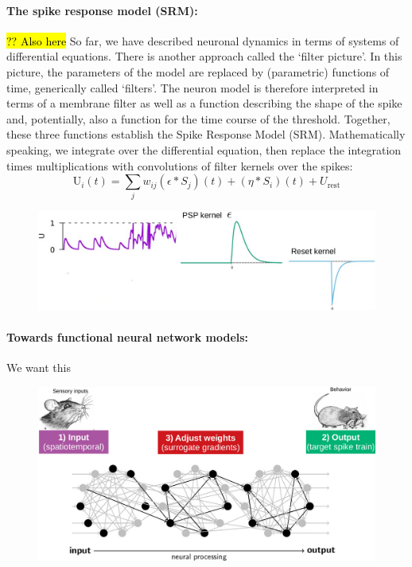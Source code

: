 \documentclass[main]{subfiles}
\begin{document}
\paragraph{The spike response model (SRM):}
\hl{?? Also here}
So far, we have described neuronal dynamics in terms of systems of differential equations. There is another approach called the ‘filter picture’. In this picture, the parameters of the model are replaced by (parametric) functions of time, generically called ‘filters’. The neuron model is therefore interpreted in terms of a membrane filter as well as a function describing the shape of the spike and, potentially, also a function for the time course of the threshold. Together, these three functions establish the Spike Response Model (SRM).
Mathematically speaking, we integrate over the differential equation, then replace the integration times multiplications with convolutions of filter kernels over the spikes:
%
\begin{equation}
\mathrm{U}_{i}(t)=\sum_{j} w_{i j}\left(\epsilon * S_{j}\right)(t)+\left(\eta * S_{i}\right)(t)+U_{\mathrm{rest}}
\end{equation}
%
\begin{figure}[H]
    \centering
    \includegraphics[width=0.7\linewidth]{10_DeepLearningWithSpikes/figures/spike_response_model.png}
    \caption{}
    \label{fig:my_label}
\end{figure}
%
\paragraph{Towards functional neural network models: }
We want this
\begin{figure}[H]
    \centering
    \includegraphics[width=0.8\linewidth]{10_DeepLearningWithSpikes/figures/towards_functional_nn.png}
    \caption{}
    \label{fig:my_label}
\end{figure}
\end{document}
